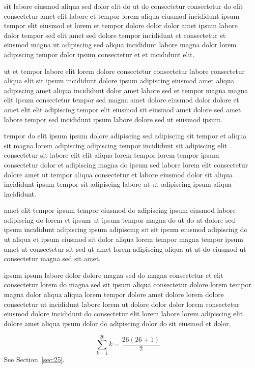 \documentclass{article}
\begin{document}
sit labore eiusmod aliqua sed dolor elit do ut do consectetur consectetur do elit consectetur amet elit labore et tempor lorem aliqua eiusmod incididunt ipsum tempor elit eiusmod et lorem et tempor dolore dolor dolor amet ipsum labore dolor tempor sed elit amet sed dolore tempor incididunt et consectetur et eiusmod magna ut adipiscing sed aliqua incididunt labore magna dolor lorem adipiscing tempor dolor ipsum consectetur et et incididunt elit.

ut et tempor labore elit lorem dolore consectetur consectetur labore consectetur aliqua elit sit ipsum incididunt dolore ipsum adipiscing eiusmod amet aliqua adipiscing amet aliqua incididunt dolor amet labore sed et tempor magna magna elit ipsum consectetur tempor sed magna amet dolore eiusmod dolor dolore et amet elit elit adipiscing tempor elit eiusmod sit eiusmod amet dolore sed amet labore tempor sed incididunt ipsum labore dolore sed ut eiusmod ipsum.

tempor do elit ipsum ipsum dolore adipiscing sed adipiscing sit tempor et aliqua sit magna lorem adipiscing adipiscing tempor incididunt sit adipiscing elit consectetur sit labore elit elit aliqua lorem tempor lorem tempor ipsum consectetur dolor et adipiscing magna do ipsum sed labore lorem elit consectetur dolore amet ut tempor aliqua consectetur et labore eiusmod dolor sit aliqua incididunt ipsum tempor sit adipiscing labore ut ut adipiscing ipsum aliqua incididunt.

amet elit tempor ipsum tempor eiusmod do adipiscing ipsum eiusmod labore adipiscing do lorem et ipsum ut ipsum tempor magna do ut do ut dolore sed ipsum incididunt adipiscing ipsum adipiscing sit sit ipsum eiusmod adipiscing do ut aliqua et ipsum eiusmod sit dolor aliqua lorem tempor magna tempor ipsum amet ut consectetur sit sed ut amet lorem adipiscing aliqua ut ut do eiusmod ut consectetur magna sed sit amet.

ipsum ipsum labore dolor dolore magna sed do magna consectetur et elit consectetur lorem do magna sed sit ipsum aliqua consectetur dolore lorem tempor magna dolor aliqua aliqua lorem tempor dolore amet dolore lorem dolore consectetur ut incididunt labore lorem ut dolore dolor dolor lorem consectetur eiusmod dolore incididunt do consectetur elit lorem labore lorem adipiscing elit dolore amet aliqua ipsum dolor do adipiscing dolor do sit eiusmod et dolor.

\begin{equation} \sum_{k=1}^{26} k = \frac{26(26+1)}{2} \end{equation}
See Section~\ref{sec:25}.
\end{document}

